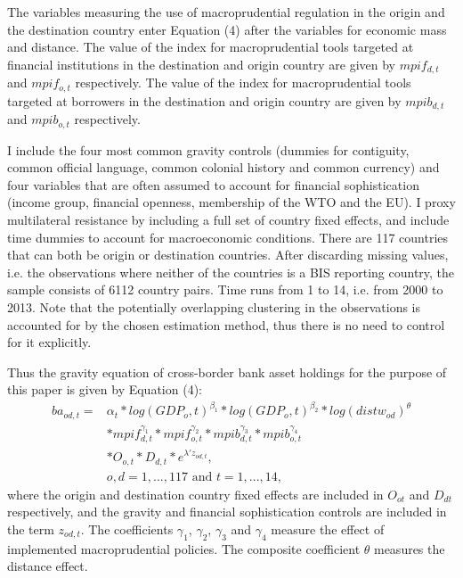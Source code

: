 \documentclass[12pt,a4paper]{article}
\begin{document}
The variables measuring the use of macroprudential regulation in the origin and the destination country enter Equation (4) after the variables for economic mass and distance. The value of the index for macroprudential tools targeted at financial institutions in the destination and origin country are given by $mpif_{d,t}$ and $mpif_{o,t}$ respectively. The value of the index for macroprudential tools targeted at borrowers in the destination and origin country are given by $mpib_{d,t}$ and $mpib_{o,t}$ respectively. 

I include the four most common gravity controls (dummies for contiguity, common official language, common colonial history and common currency) and four variables that are often assumed to account for financial sophistication (income group, financial openness, membership of the WTO and the EU). I proxy multilateral resistance by including a full set of country fixed effects, and include time dummies to account for macroeconomic conditions. There are 117 countries that can both be origin or destination countries. After discarding missing values, i.e. the observations where neither of the countries is a BIS reporting country, the sample consists of 6112 country pairs. Time runs from 1 to 14, i.e. from 2000 to 2013. Note that the potentially overlapping clustering in the observations is accounted for by the chosen estimation method, thus there is no need to control for it explicitly.

Thus the gravity equation of cross-border bank asset holdings for the purpose of this paper is given by Equation (4):
\begin{align}
ba_{od,t} = & \alpha_t * log(GDP_o,t)^{\beta_1} * log(GDP_o,t)^{\beta_2} * log(distw_{od})^{\theta} \nonumber \\
& * mpif_{d,t}^{\gamma_1} * mpif_{o,t}^{\gamma_2} * mpib_{d,t}^{\gamma_3} * mpib_{o,t}^{\gamma_4} \nonumber \\
& * O_{o,t} * D_{d,t} * e^{\lambda'z_{od,t}}, \\
& o, d=1, ..., 117 \text{ and } t=1, ..., 14, \nonumber
\label{eq:gravity}
\end{align}
where the origin and destination country fixed effects are included in $O_{ot}$ and $D_{dt}$ respectively, and the gravity and financial sophistication controls are included in the term $z_{od,t}$. The coefficients $\gamma_1$, $\gamma_2$, $\gamma_3$ and $\gamma_4$ measure the effect of implemented macroprudential policies. The composite coefficient $\theta$ measures the distance effect.
\end{document}
